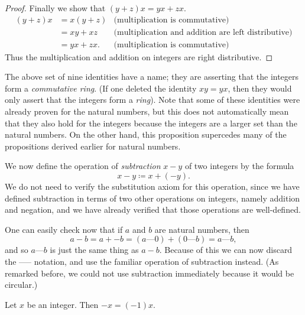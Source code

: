\begin{proof}
    Finally we show that \((y + z)x = yx + zx\).
    \begin{align*}
        (y + z)x & = x(y + z) & \text{(multiplication is commutative)}                     \\
                 & = xy + xz  & \text{(multiplication and addition are left distributive)} \\
                 & = yx + zx. & \text{(multiplication is commutative)}
    \end{align*}
    Thus the multiplication and addition on integers are right distributive.
\end{proof}

\begin{remark}\label{4.1.7}
    The above set of nine identities have a name; they are asserting that the integers form a \emph{commutative ring}.
    (If one deleted the identity \(xy = yx\), then they would only assert that the integers form a \emph{ring}).
    Note that some of these identities were already proven for the natural numbers, but this does not automatically mean that they also hold for the integers because the integers are a larger set than the natural numbers.
    On the other hand, this proposition supercedes many of the propositions derived earlier for natural numbers.
\end{remark}

\begin{note}
    We now define the operation of \emph{subtraction} \(x - y\) of two integers by the formula
    \[
        x - y \coloneqq x + (-y).
    \]
    We do not need to verify the substitution axiom for this operation, since we have defined subtraction in terms of two other operations on integers, namely addition and negation, and we have already verified that those operations are well-defined.
\end{note}

\begin{note}
    One can easily check now that if \(a\) and \(b\) are natural numbers, then
    \[
        a - b = a + -b = (a \text{---} 0) + (0 \text{---} b) = a \text{---} b,
    \]
    and so \(a \text{---} b\) is just the same thing as \(a - b\).
    Because of this we can now discard the ----- notation, and use the familiar operation of subtraction instead.
    (As remarked before, we could not use subtraction immediately because it would be circular.)
\end{note}

\begin{additional corollary}\label{ac 4.1.3}
Let \(x\) be an integer.
Then \(-x = (-1)x\).
\end{additional corollary}

